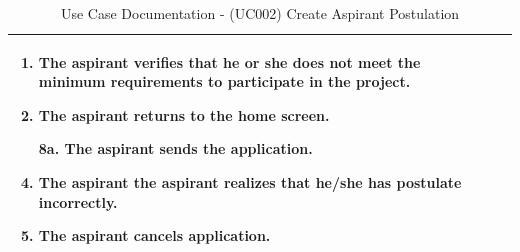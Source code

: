 \documentclass{scrreprt}
\begin{document}
\begin{table}[H]
\begin{tabular}{|p{3cm}|p{10cm}|}
\begin{enumerate}
			\item The aspirant verifies that he or she does not meet the minimum requirements to participate in the project.
			\item The aspirant returns to the home screen.
			\item[8a.] The aspirant sends the application.
			\item The aspirant the aspirant realizes that he/she has postulate incorrectly.
			\item The aspirant cancels application.
		\end{enumerate} 
		\\ \hline
	\end{tabular}
	\caption{Use Case Documentation - (UC002) Create Aspirant Postulation}
	\label{table:UC002}
\end{table}
\end{document}
